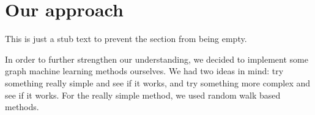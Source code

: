 \section{Our approach}
This is just a stub text to prevent the section from being empty.

In order to further strengthen our understanding, we decided to implement some graph machine learning methods ourselves.
We had two ideas in mind: try something really simple and see if it works, and try something more complex and see if it works.
For the really simple method, we used random walk based methods.